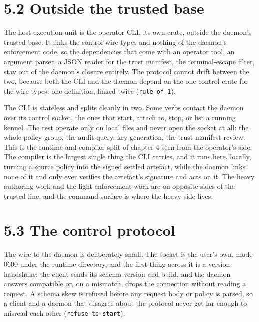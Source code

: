 \hypertarget{outside-the-trusted-base}{%
\section{5.2 Outside the trusted base}\label{outside-the-trusted-base}}

The host execution unit is the operator CLI, its own crate, outside the
daemon's trusted base. It links the control-wire types and nothing of
the daemon's enforcement code, so the dependencies that come with an
operator tool, an argument parser, a JSON reader for the trust manifest,
the terminal-escape filter, stay out of the daemon's closure entirely.
The protocol cannot drift between the two, because both the CLI and the
daemon depend on the one control crate for the wire types: one
definition, linked twice (\texttt{rule-of-1}).

The CLI is stateless and splits cleanly in two. Some verbs contact the
daemon over its control socket, the ones that start, attach to, stop, or
list a running kennel. The rest operate only on local files and never
open the socket at all: the whole policy group, the audit query, key
generation, the trust-manifest review. This is the runtime-and-compiler
split of chapter 4 seen from the operator's side. The compiler is the
largest single thing the CLI carries, and it runs here, locally, turning
a source policy into the signed settled artefact, while the daemon links
none of it and only ever verifies the artefact's signature and acts on
it. The heavy authoring work and the light enforcement work are on
opposite sides of the trusted line, and the command surface is where the
heavy side lives.

\hypertarget{the-control-protocol}{%
\section{5.3 The control protocol}\label{the-control-protocol}}

The wire to the daemon is deliberately small. The socket is the user's
own, mode 0600 under the runtime directory, and the first thing across
it is a version handshake: the client sends its schema version and
build, and the daemon answers compatible or, on a mismatch, drops the
connection without reading a request. A schema skew is refused before
any request body or policy is parsed, so a client and a daemon that
disagree about the protocol never get far enough to misread each other
(\texttt{refuse-to-start}).

